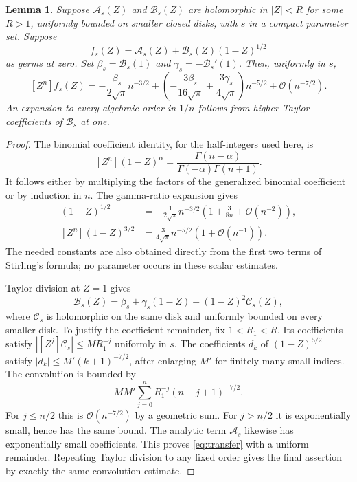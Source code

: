 \documentclass[11pt,a4paper]{article}
\newtheorem{lemma}[theorem]{Lemma}
\theoremstyle{definition}
\theoremstyle{remark}
\newcommand{\OO}{\mathcal O}
\newcommand{\coeff}[2]{[#1^{#2}]}
\begin{document}
\begin{lemma}\label{lem:transfer}
Suppose $\mathcal A_s(Z)$ and $\mathcal B_s(Z)$ are holomorphic in
$|Z|<R$ for some $R>1$, uniformly bounded on smaller closed disks, with
$s$ in a compact parameter set. Suppose
\[
 f_s(Z)=\mathcal A_s(Z)+\mathcal B_s(Z)(1-Z)^{1/2}
\]
as germs at zero. Set
$\beta_s=\mathcal B_s(1)$ and
$\gamma_s=-\mathcal B_s'(1)$. Then, uniformly in $s$,
\begin{equation}\label{eq:transfer}
 \coeff{Z}{n}f_s(Z)
 =-\frac{\beta_s}{2\sqrt\pi}n^{-3/2}
   +\left(-\frac{3\beta_s}{16\sqrt\pi}
          +\frac{3\gamma_s}{4\sqrt\pi}\right)n^{-5/2}
   +\OO(n^{-7/2}).
\end{equation}
An expansion to every algebraic order in $1/n$ follows from higher
Taylor coefficients of $\mathcal B_s$ at one.
\end{lemma}
\begin{proof}
The binomial coefficient identity, for the half-integers used here, is
\begin{equation}\label{eq:gamma-coeff}
 \coeff{Z}{n}(1-Z)^\alpha
 =\frac{\Gamma(n-\alpha)}{\Gamma(-\alpha)\Gamma(n+1)}.
\end{equation}
It follows either by multiplying the factors of the generalized binomial
coefficient or by induction in $n$. The gamma-ratio expansion gives
\begin{align*}
 \coeff{Z}{n}(1-Z)^{1/2}
   &=-\frac1{2\sqrt\pi}n^{-3/2}
                          \left(1+\frac3{8n}+\OO(n^{-2})\right),\\
 \coeff{Z}{n}(1-Z)^{3/2}
   &=\frac3{4\sqrt\pi}n^{-5/2}(1+\OO(n^{-1})).
\end{align*}
The needed constants are also obtained directly from the first two terms
of Stirling's formula; no parameter occurs in these scalar estimates.

Taylor division at $Z=1$ gives
\[
 \mathcal B_s(Z)=\beta_s+\gamma_s(1-Z)+(1-Z)^2\mathcal C_s(Z),
\]
where $\mathcal C_s$ is holomorphic on the same disk and uniformly bounded
on every smaller disk. To justify the coefficient remainder, fix
$1<R_1<R$. Its coefficients satisfy
$|\coeff{Z}{j}\mathcal C_s|\le M R_1^{-j}$ uniformly in $s$.
The coefficients $d_k$ of $(1-Z)^{5/2}$ satisfy
$|d_k|\le M'(k+1)^{-7/2}$, after enlarging $M'$ for finitely many small
indices. The convolution is bounded by
\[
 MM'\sum_{j=0}^nR_1^{-j}(n-j+1)^{-7/2}.
\]
For $j\le n/2$ this is $\OO(n^{-7/2})$ by a geometric sum. For
$j>n/2$ it is exponentially small, hence has the same bound. The analytic
term $\mathcal A_s$ likewise has exponentially small coefficients.
This proves \eqref{eq:transfer} with a uniform remainder. Repeating
Taylor division to any fixed order gives the final assertion by exactly
the same convolution estimate.
\end{proof}
\end{document}
